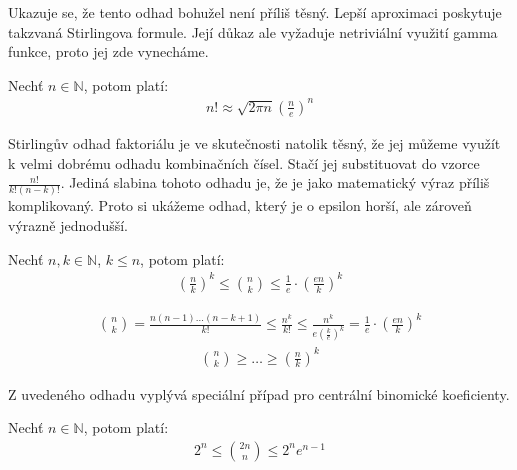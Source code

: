 Ukazuje se, že tento odhad bohužel není příliš těsný. Lepší aproximaci poskytuje takzvaná Stirlingova formule. Její důkaz ale vyžaduje netriviální využití gamma funkce, proto jej zde vynecháme.
\begin{t_fact}
  Nechť $n\in\mathbb{N}$, potom platí:
  \begin{align*}
    n! \approx \sqrt{2\pi n}\left(\frac{n}{e}\right)^n
  \end{align*}  
\end{t_fact}

Stirlingův odhad faktoriálu je ve skutečnosti natolik těsný, že jej můžeme využít k velmi dobrému odhadu kombinačních čísel. Stačí jej substituovat do vzorce $\frac{n!}{k!(n-k)!}$. Jediná slabina tohoto odhadu je, že je jako matematický výraz příliš komplikovaný. Proto si ukážeme odhad, který je o epsilon horší, ale zároveň výrazně jednodušší.

\begin{t_theorem}
  Nechť $n,k\in\mathbb{N}$, $k\leq n$, potom platí:
  \begin{align*}
    \left(\frac{n}{k}\right)^k\leq \binom{n}{k}\leq \frac{1}{e}\cdot\left(\frac{en}{k}\right)^k
  \end{align*}
\end{t_theorem}
\begin{t_proof}
  \begin{align*}
    \binom{n}{k}=\frac{n(n-1)\dots(n-k+1)}{k!}
    \leq \frac{n^k}{k!}
    \leq \frac{n^k}{e\left(\frac{k}{e}\right)^k}
    = \frac{1}{e}\cdot\left(\frac{en}{k}\right)^k
  \end{align*}
  \begin{align*}
    \binom{n}{k}
    \geq \dots %
    \geq \left(\frac{n}{k}\right)^k
  \end{align*}
\end{t_proof}

Z uvedeného odhadu vyplývá speciální případ pro centrální binomické koeficienty.
\begin{t_corollary}
  Nechť $n\in\mathbb{N}$, potom platí:
  \begin{align*}
    2^n\leq \binom{2n}{n}\leq 2^ne^{n-1}
  \end{align*}
\end{t_corollary}

